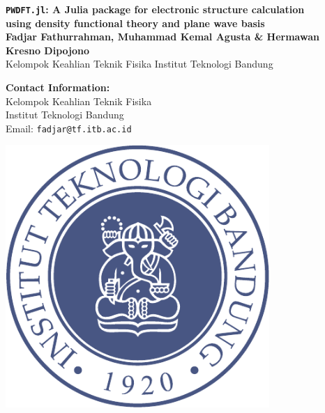 \documentclass[a0,landscape]{a0poster}
\begin{document}


\begin{minipage}[b]{0.60\linewidth}
{\Huge \color{NavyBlue} \textbf{\texttt{PWDFT.jl}: A Julia package for electronic structure calculation \\
using density functional theory and plane wave basis} \color{Black}}\\
\huge \textbf{Fadjar Fathurrahman, Muhammad Kemal Agusta \& Hermawan Kresno Dipojono }\\ %
\huge Kelompok Keahlian Teknik Fisika Institut Teknologi Bandung \\ %
\end{minipage}
%
\begin{minipage}[b]{0.15\linewidth}
\color{DarkSlateGray}\Large \textbf{Contact Information:}\\
Kelompok Keahlian Teknik Fisika \\ %
Institut Teknologi Bandung \\
Email: \texttt{fadjar@tf.itb.ac.id}\\ %
\end{minipage}
%
\begin{minipage}[b]{0.125\linewidth}
\includegraphics[width=10cm]{ITB_logo.pdf}\\
\end{minipage}
\end{document}
